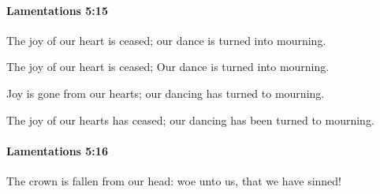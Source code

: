 		\paragraph{Lamentations 5:15} %
			\label{LAMENTATIONS-5-15}

			The joy of our heart is ceased; our dance is turned into mourning.

			\begin{versebox}
					\item[BHS] 
					\item[LXX] 
					\item[ASV] The joy of our heart is ceased; Our dance is turned into mourning.
					\item[NIV] Joy is gone from our hearts; our dancing has turned to mourning.
					\item[NRSV] The joy of our hearts has ceased; our dancing has been turned to mourning.
			\end{versebox}

		\paragraph{Lamentations 5:16} %
			\label{LAMENTATIONS-5-16}

			The crown is fallen from our head: woe unto us, that we have sinned!

